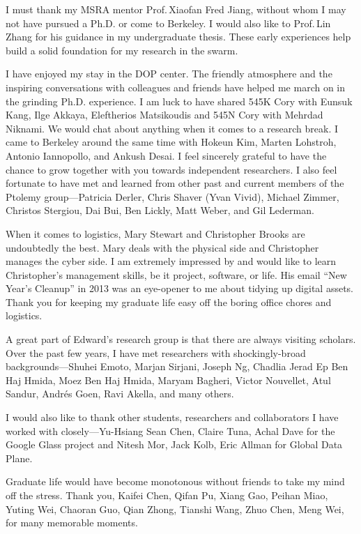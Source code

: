 \documentclass[thesis.tex]{subfiles}
\begin{document}
\begin{acknowledgements}
  I must thank my MSRA mentor Prof.\,Xiaofan Fred Jiang, without whom I may not
  have pursued a Ph.D. or come to Berkeley. I would also like to Prof.\,Lin
  Zhang for his guidance in my undergraduate thesis. These early experiences
  help build a solid foundation for my research in the swarm.

  I have enjoyed my stay in the DOP center. The friendly atmosphere and the
  inspiring conversations with colleagues and friends have helped me march on in
  the grinding Ph.D. experience. I am luck to have shared 545K Cory with Eunsuk
  Kang, Ilge Akkaya, Eleftherios Matsikoudis and 545N Cory with Mehrdad
  Niknami. We would chat about anything when it comes to a research break. I
  came to Berkeley around the same time with Hokeun Kim, Marten Lohstroh,
  Antonio Iannopollo, and Ankush Desai. I feel sincerely grateful to have the
  chance to grow together with you towards independent researchers. I also feel
  fortunate to have met and learned from other past and current members of the
  Ptolemy group---Patricia Derler, Chris Shaver (Yvan Vivid), Michael Zimmer,
  Christos Stergiou, Dai Bui, Ben Lickly, Matt Weber, and Gil Lederman.

  When it comes to logistics, Mary Stewart and Christopher Brooks are
  undoubtedly the best. Mary deals with the physical side and Christopher
  manages the cyber side. I am extremely impressed by and would like to learn
  Christopher's management skills, be it project, software, or life. His email
  ``New Year's Cleanup'' in 2013 was an eye-opener to me about tidying up
  digital assets. Thank you for keeping my graduate life easy off the boring
  office chores and logistics.

  A great part of Edward's research group is that there are always visiting
  scholars. Over the past few years, I have met researchers with
  shockingly-broad backgrounds---Shuhei Emoto, Marjan Sirjani, Joseph Ng,
  Chadlia Jerad Ep Ben Haj Hmida, Moez Ben Haj Hmida, Maryam Bagheri, Victor
  Nouvellet, Atul Sandur, Andr\'es Goen, Ravi Akella, and many others.

  I would also like to thank other students, researchers and collaborators I
  have worked with closely---Yu-Hsiang Sean Chen, Claire Tuna, Achal Dave for
  the Google Glass project and Nitesh Mor, Jack Kolb, Eric Allman for Global
  Data Plane.

  Graduate life would have become monotonous without friends to take my mind off
  the stress. Thank you, Kaifei Chen, Qifan Pu, Xiang Gao, Peihan Miao, Yuting
  Wei, Chaoran Guo, Qian Zhong, Tianshi Wang, Zhuo Chen, Meng Wei, for many
  memorable moments.


\end{acknowledgements}
\end{document}
